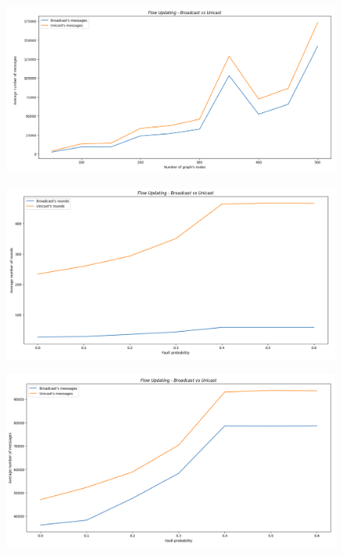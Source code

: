 \documentclass[a4paper]{report}
\begin{document}
{	\begin{figure}[H]
		\centering
		\includegraphics[width=0.99\textwidth]{Images/Plot2.png}
		\label{fig:2}
	\end{figure}

	\begin{figure}[H]
		\centering
		\includegraphics[width=0.99\textwidth]{Images/Plot3.png}
		\label{fig:3}
	\end{figure}

	\begin{figure}[H]
		\centering
		\includegraphics[width=0.99\textwidth]{Images/Plot4.png}
		\label{fig:4}
	\end{figure}
}
\end{document}
